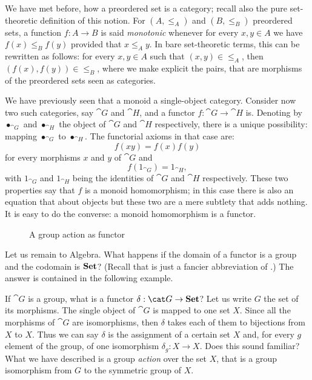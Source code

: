 \begin{example}
We have met before, how a preordered set is a category; recall also the pure set-theoretic definition of this notion. For \((A, \le_A)\) and \((B, \le_B)\) preordered sets, a function \(f : A \to B\) is said {\em monotonic} whenever for every \(x, y \in A\) we have \(f(x) \le_B f(y)\) provided that \(x \le_A y\). In bare set-theoretic terms, this can be rewritten as follows: for every \(x, y \in A\) such that \((x, y) \in \le_A\), then \((f(x), f(y)) \in \le_B\), where  we make explicit the pairs, that are morphisms of the preordered sets seen as categories.
\end{example}

\begin{example}
We have previously seen that a monoid  a single-object category. Consider now two such categories, say \(\cat G\) and \(\cat H\), and a functor \(f : \cat G \to \cat H\) is. Denoting by \(\bullet_{\cat G}\) and \(\bullet_{\cat H}\) the object of \(\cat G\) and \(\cat H\) respectively, there is a unique possibility: mapping \(\bullet_{\cat G}\) to \(\bullet_{\cat H}\). The functorial axioms in that case are:
\[f(xy) = f(x)f(y)\]
for every morphisms \(x\) and \(y\) of \(\cat G\) and
\[f(1_{\cat G}) = 1_{\cat H} ,\]
with \(1_{\cat G}\) and \(1_{\cat H}\) being the identities of \(\cat G\) and \(\cat H\) respectively. These two properties say that \(f\) is a monoid homomorphism; in this case there is also an equation that about objects but these two are a mere subtlety that adds nothing. It is easy to do the converse: a monoid homomorphism is a functor.
\end{example}

\begin{figure}
\centering

\caption{A group action as functor}
\end{figure}

Let us remain to Algebra. What happens if the domain of a functor is a group and the codomain is \(\mathbf{Set}\)? (Recall that  is just a fancier abbreviation of .) The answer is contained in the following example.

\begin{example}
If \(\cat G\) is a group, what is a functor \(\delta : \cat G \to \Set\)? Let us write \(G\) the set of its morphisms. The single object of \(\cat G\) is mapped to one set \(X\). Since all the morphisms of \(\cat G\) are isomorphisms, then \(\delta\) takes each of them to bijections from \(X\) to \(X\). Thus we can say \(\delta\) is the assignment of a certain set \(X\) and, for every \(g\) element of the group, of one isomorphism \(\delta_g : X \to X\). Does this sound familiar? What we have described is a group {\em action} over the set \(X\), that is a group isomorphism from \(G\) to the symmetric group of \(X\).
\end{example}

